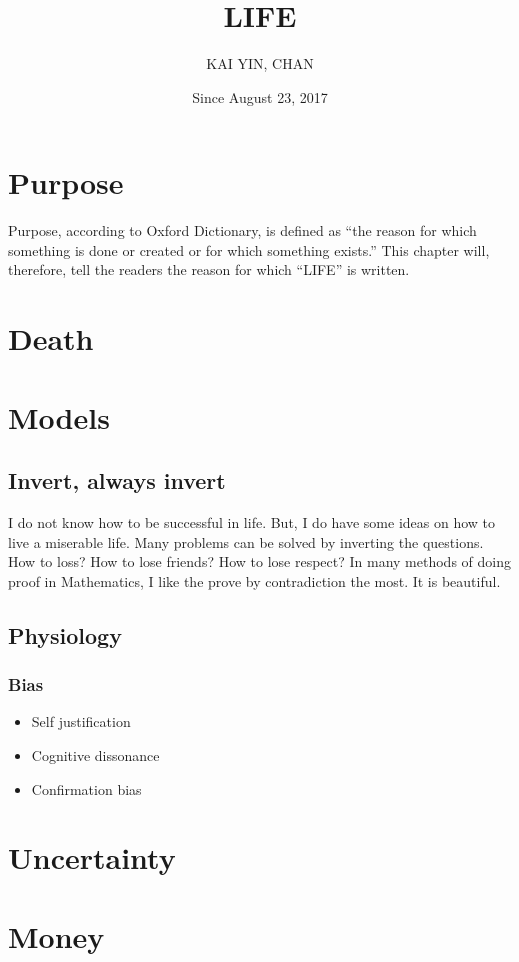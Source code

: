 \documentclass[a4paper]{report}
\begin{document}
\title{LIFE}
\author{KAI YIN, CHAN}
\date{Since August 23, 2017}
\maketitle

\chapter{Purpose}
Purpose, according to Oxford Dictionary, is defined as ``the reason for which something is done or created or for which something exists.'' This chapter will, therefore, tell the readers the reason for which ``LIFE'' is written.

\chapter{Death}

\chapter{Models}
\section{Invert, always invert}
I do not know how to be successful in life. But, I do have some ideas on how to live a miserable life. Many problems can be solved by inverting the questions. How to loss? How to lose friends? How to lose respect? In many methods of doing proof in Mathematics, I like the prove by contradiction the most. It is beautiful.

\section{Physiology}
\subsection{Bias}
\begin{itemize}
\item Self justification
\item Cognitive dissonance
\item Confirmation bias
\end{itemize}
\chapter{Uncertainty}

\chapter{Money}
\end{document}
